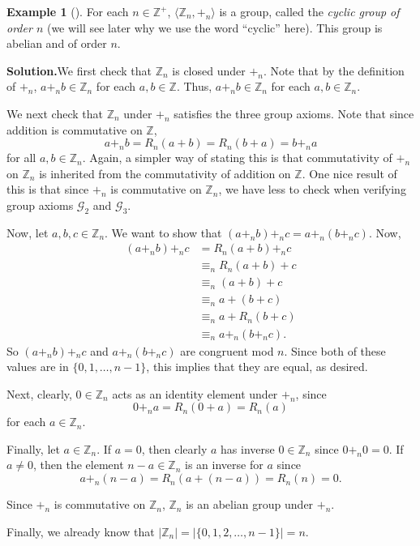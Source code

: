 \documentclass[10pt,openany,oneside]{book}
\theoremstyle{plain}
\theoremstyle{definition}
\theoremstyle{definition}
\theoremstyle{definition}
\newtheorem{example}[theorem]{Example}
\theoremstyle{definition}
\numberwithin{equation}{section}
\def\Z{\mathbb{Z}}
\def\G{\mathcal{G}}
\newcommand{\amp}{&}
\begin{document}
\begin{example}[]\label{example-16}
\label{notation-42}
 For each \(n\in \Z^+\), \(\langle \Z_n,+_n\rangle\) is a group, called the \emph{cyclic group of order \(n\)} (we will see later why we use the word ``cyclic'' here). This group is abelian and of order \(n\).%
\par\medskip\noindent%
\textbf{Solution.}\quad We first check that \(\Z_n\) is closed under \(+_n\). Note that by the definition of \(+_n\), \(a+_nb \in \Z_n\) for each \(a,b\in \Z\). Thus, \(a+_nb \in \Z_n\) for each \(a,b\in \Z_n\).%
\par
We next check that \(\Z_n\) under \(+_n\) satisfies the three group axioms. Note that since addition is commutative on \(\Z\),%
\begin{equation*}
a+_n b =R_n(a+b)=R_n(b+a)=b+_n a
\end{equation*}
for all \(a,b\in \Z_n\). Again, a simpler way of stating this is that commutativity of \(+_n\) on \(\Z_n\) is inherited from the commutativity of addition on \(\Z\). One nice result of this is that since \(+_n\) is commutative on \(\Z_n\), we have less to check when verifying group axioms \(\G_2\) and \(\G_3\).%
\par
Now, let \(a,b,c\in \Z_n\).  We want to show that \((a+_n b)+_n c = a +_n(b+_n c)\). Now,%
\begin{align*}
(a+_n b)+_n c\amp =R_n(a+b)+_n c\\
\amp \equiv_n R_n(a+b)+c\\\
\amp \equiv_n (a+b)+c\\\
\amp \equiv_n a+(b+c)\\
\amp \equiv_n a+R_n(b+c)\\
\amp \equiv_n a+_n (b+_n c).
\end{align*}
So \((a+_n b)+_n c\) and \(a+_n (b+_n c)\) are congruent mod \(n\).  Since both of these values are in \(\{0,1,\ldots, n-1\}\), this implies that they are equal, as desired.%
\par
Next, clearly, \(0\in \Z_n\) acts as an identity element under \(+_n\), since%
\begin{equation*}
0+_n a =R_n(0+a)=R_n(a)
\end{equation*}
for each \(a\in \Z_n\).%
\par
Finally, let \(a\in \Z_n\).  If \(a=0\), then clearly \(a\) has inverse \(0\in \Z_n\) since \(0+_n 0 = 0\). If \(a\neq 0\), then the element \(n-a\in \Z_n\) is an inverse for \(a\) since%
\begin{equation*}
a+_n(n-a)=R_n(a+(n-a))=R_n(n)=0.
\end{equation*}
%
\par
Since \(+_n\) is commutative on \(\Z_n\), \(\Z_n\) is an abelian group under \(+_n\).%
\par
Finally, we already know that \(|\Z_n|=|\{0,1,2,\ldots,n-1\}|=n\).%
\end{example}
\end{document}
